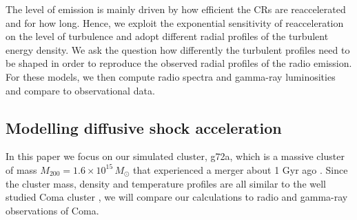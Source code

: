 \documentclass[fleqn,usenatbib,useAMS]{mnras}
\begin{document}
The level of emission is mainly driven by how efficient the CRs are
reaccelerated and for how long. Hence, we exploit the exponential
sensitivity of reacceleration on the level of turbulence and adopt
different radial profiles of the turbulent energy density. We ask the
question how differently the turbulent profiles need to be shaped in
order to reproduce the observed radial profiles of the radio
emission. For these models, we then compute radio spectra and
gamma-ray luminosities and compare to observational data.


\subsection{Modelling diffusive shock acceleration}
\label{sec:cosmo_sim}
In this paper we focus on our simulated cluster, g72a, which is a
massive cluster of mass $M_{200}=1.6\times10^{15}\,M_\odot$ that
experienced a merger about 1 Gyr ago
\citep{2009MNRAS.399..497D}. Since the cluster mass, density and
temperature profiles are all similar to the well studied Coma cluster
\citep{2007MNRAS.378..385P,pinzke10}, we will compare our calculations
to radio and gamma-ray observations of Coma.
\end{document}
